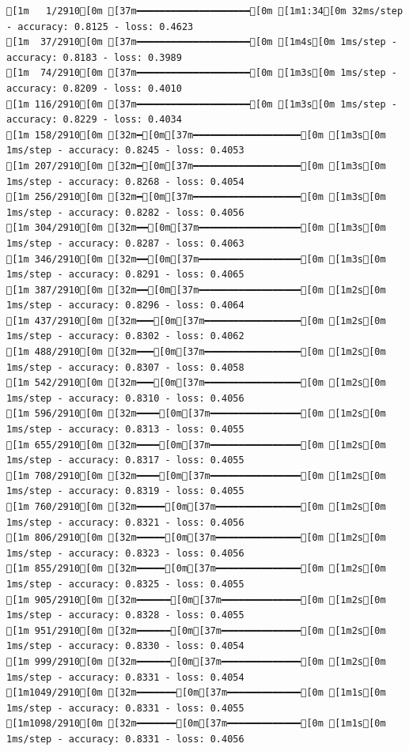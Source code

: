 \documentclass[
  letterpaper,
  DIV=11,
  numbers=noendperiod]{scrartcl}
\begin{document}
\begin{verbatim}
[1m   1/2910[0m [37m━━━━━━━━━━━━━━━━━━━━[0m [1m1:34[0m 32ms/step - accuracy: 0.8125 - loss: 0.4623
[1m  37/2910[0m [37m━━━━━━━━━━━━━━━━━━━━[0m [1m4s[0m 1ms/step - accuracy: 0.8183 - loss: 0.3989   
[1m  74/2910[0m [37m━━━━━━━━━━━━━━━━━━━━[0m [1m3s[0m 1ms/step - accuracy: 0.8209 - loss: 0.4010
[1m 116/2910[0m [37m━━━━━━━━━━━━━━━━━━━━[0m [1m3s[0m 1ms/step - accuracy: 0.8229 - loss: 0.4034
[1m 158/2910[0m [32m━[0m[37m━━━━━━━━━━━━━━━━━━━[0m [1m3s[0m 1ms/step - accuracy: 0.8245 - loss: 0.4053
[1m 207/2910[0m [32m━[0m[37m━━━━━━━━━━━━━━━━━━━[0m [1m3s[0m 1ms/step - accuracy: 0.8268 - loss: 0.4054
[1m 256/2910[0m [32m━[0m[37m━━━━━━━━━━━━━━━━━━━[0m [1m3s[0m 1ms/step - accuracy: 0.8282 - loss: 0.4056
[1m 304/2910[0m [32m━━[0m[37m━━━━━━━━━━━━━━━━━━[0m [1m3s[0m 1ms/step - accuracy: 0.8287 - loss: 0.4063
[1m 346/2910[0m [32m━━[0m[37m━━━━━━━━━━━━━━━━━━[0m [1m3s[0m 1ms/step - accuracy: 0.8291 - loss: 0.4065
[1m 387/2910[0m [32m━━[0m[37m━━━━━━━━━━━━━━━━━━[0m [1m2s[0m 1ms/step - accuracy: 0.8296 - loss: 0.4064
[1m 437/2910[0m [32m━━━[0m[37m━━━━━━━━━━━━━━━━━[0m [1m2s[0m 1ms/step - accuracy: 0.8302 - loss: 0.4062
[1m 488/2910[0m [32m━━━[0m[37m━━━━━━━━━━━━━━━━━[0m [1m2s[0m 1ms/step - accuracy: 0.8307 - loss: 0.4058
[1m 542/2910[0m [32m━━━[0m[37m━━━━━━━━━━━━━━━━━[0m [1m2s[0m 1ms/step - accuracy: 0.8310 - loss: 0.4056
[1m 596/2910[0m [32m━━━━[0m[37m━━━━━━━━━━━━━━━━[0m [1m2s[0m 1ms/step - accuracy: 0.8313 - loss: 0.4055
[1m 655/2910[0m [32m━━━━[0m[37m━━━━━━━━━━━━━━━━[0m [1m2s[0m 1ms/step - accuracy: 0.8317 - loss: 0.4055
[1m 708/2910[0m [32m━━━━[0m[37m━━━━━━━━━━━━━━━━[0m [1m2s[0m 1ms/step - accuracy: 0.8319 - loss: 0.4055
[1m 760/2910[0m [32m━━━━━[0m[37m━━━━━━━━━━━━━━━[0m [1m2s[0m 1ms/step - accuracy: 0.8321 - loss: 0.4056
[1m 806/2910[0m [32m━━━━━[0m[37m━━━━━━━━━━━━━━━[0m [1m2s[0m 1ms/step - accuracy: 0.8323 - loss: 0.4056
[1m 855/2910[0m [32m━━━━━[0m[37m━━━━━━━━━━━━━━━[0m [1m2s[0m 1ms/step - accuracy: 0.8325 - loss: 0.4055
[1m 905/2910[0m [32m━━━━━━[0m[37m━━━━━━━━━━━━━━[0m [1m2s[0m 1ms/step - accuracy: 0.8328 - loss: 0.4055
[1m 951/2910[0m [32m━━━━━━[0m[37m━━━━━━━━━━━━━━[0m [1m2s[0m 1ms/step - accuracy: 0.8330 - loss: 0.4054
[1m 999/2910[0m [32m━━━━━━[0m[37m━━━━━━━━━━━━━━[0m [1m2s[0m 1ms/step - accuracy: 0.8331 - loss: 0.4054
[1m1049/2910[0m [32m━━━━━━━[0m[37m━━━━━━━━━━━━━[0m [1m1s[0m 1ms/step - accuracy: 0.8331 - loss: 0.4055
[1m1098/2910[0m [32m━━━━━━━[0m[37m━━━━━━━━━━━━━[0m [1m1s[0m 1ms/step - accuracy: 0.8331 - loss: 0.4056

\end{verbatim}
\end{document}
